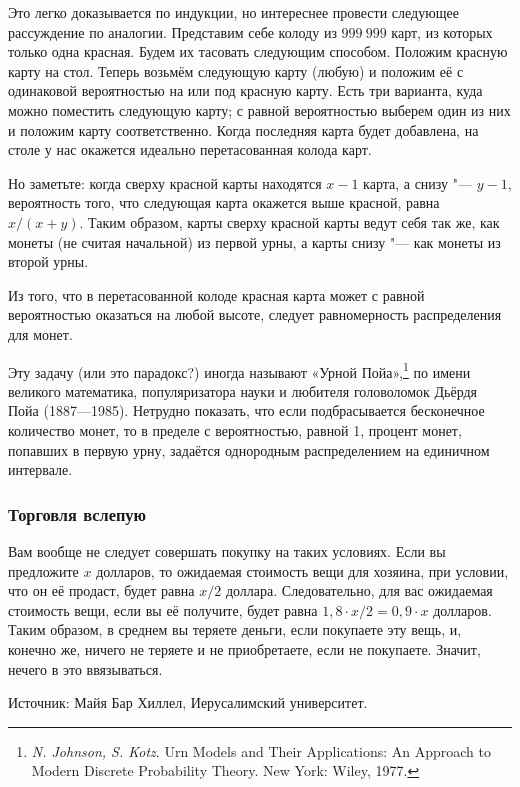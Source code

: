 \documentclass[twoside]{book}
\begin{document}
Это легко доказывается по индукции, но интереснее провести
следующее рассуждение по аналогии.
Представим себе колоду из 
$999~999$
карт, из которых только одна красная.
Будем их тасовать следующим способом.
Положим красную карту на стол.
Теперь возьмём следующую карту (любую) и положим её с одинаковой вероятностью на или под красную карту.
Есть три варианта, куда можно поместить следующую карту; с равной
вероятностью выберем один из них и положим карту соответственно.
Когда последняя карта будет добавлена, на столе у нас окажется идеально перетасованная колода карт.

Но заметьте: когда сверху красной карты находятся $x-1$ карта, а снизу "--- $y-1$, вероятность того, что следующая карта окажется выше красной, равна $x/(x+y)$.
Таким образом, карты сверху красной карты ведут себя так же, как
монеты (не считая начальной) из первой урны, а карты снизу "--- как
монеты из второй урны.

Из того, что в перетасованной колоде красная карта может с равной вероятностью оказаться на любой высоте, следует равномерность распределения для монет.\heart

\medskip
Эту задачу (или это парадокс?) иногда называют «Урной Пойа»,\footnote{\emph{N. Johnson, S. Kotz}. {Urn Models and Their Applications: An Approach to Modern Discrete Probability Theory.} New York: Wiley, 1977.} по имени великого математика, популяризатора науки и любителя головоломок Дьёрдя Пойа (1887---1985).
Нетрудно показать, что если подбрасывается бесконечное количество монет, то в пределе с вероятностью, равной 1, процент монет, попавших в первую урну, задаётся однородным распределением на единичном интервале.

\subsubsection*{Торговля вслепую}%

Вам вообще не следует совершать покупку на таких условиях.
Если вы предложите $x$ долларов, то ожидаемая стоимость вещи для
хозяина, при условии, что он её продаст, будет равна $x/2$ доллара.
Следовательно, для вас ожидаемая стоимость вещи, если вы её получите, будет равна $1{,}8 \cdot  x/2=0{,}9\cdot x$ долларов.
Таким образом, в среднем вы теряете деньги, если покупаете эту вещь, и, конечно же, ничего не теряете и не приобретаете, если не покупаете.
Значит, нечего в это ввязываться.
\heart

\medskip
{%
Источник: Майя Бар Хиллел, Иерусалимский университет.

}
\end{document}
